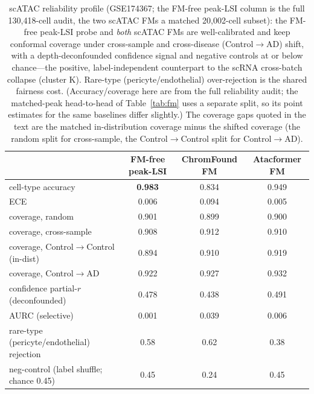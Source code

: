 \documentclass[11pt]{article}
\begin{document}
\begin{table}[!ht]\centering\footnotesize
\caption{scATAC reliability profile (GSE174367; the FM-free peak-LSI column is the full 130{,}418-cell audit, the two scATAC FMs a matched 20{,}002-cell subset): the FM-free peak-LSI probe and \emph{both} scATAC FMs are well-calibrated and keep conformal coverage under cross-sample and cross-disease (Control$\to$AD) shift, with a depth-deconfounded confidence signal and negative controls at or below chance---the positive, label-independent counterpart to the scRNA cross-batch collapse (cluster K). Rare-type (pericyte/endothelial) over-rejection is the shared fairness cost. (Accuracy/coverage here are from the full reliability audit; the matched-peak head-to-head of Table~\ref{tab:fm} uses a separate split, so its point estimates for the same baselines differ slightly.) The coverage gaps quoted in the text are the matched in-distribution coverage minus the shifted coverage (the random split for cross-sample, the Control$\to$Control split for Control$\to$AD).}
\label{tab:scatacrel}
\begin{tabular}{@{}lccc@{}}
\toprule
 & FM-free peak-LSI & ChromFound FM & Atacformer FM \\
\midrule
cell-type accuracy & \textbf{0.983} & 0.834 & 0.949 \\
ECE & 0.006 & 0.094 & 0.005 \\
coverage, random & 0.901 & 0.899 & 0.900 \\
coverage, cross-sample & 0.908 & 0.912 & 0.910 \\
coverage, Control$\to$Control (in-dist) & 0.894 & 0.910 & 0.919 \\
coverage, Control$\to$AD & 0.922 & 0.927 & 0.932 \\
confidence partial-$r$ (deconfounded) & 0.478 & 0.438 & 0.491 \\
AURC (selective) & 0.001 & 0.039 & 0.006 \\
rare-type (pericyte/endothelial) rejection & 0.58 & 0.62 & 0.38 \\
neg-control (label shuffle; chance 0.45) & 0.45 & 0.24 & 0.45 \\
\bottomrule
\end{tabular}
\end{table}
\end{document}
